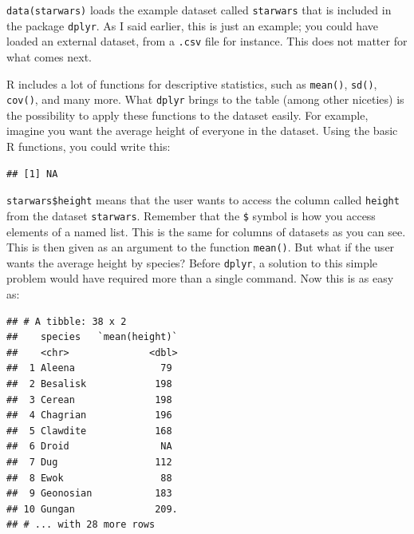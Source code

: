 \documentclass[]{gitbook}
\newenvironment{Shaded}{\begin{snugshade}}{\end{snugshade}}
\newcommand{\KeywordTok}[1]{\textcolor[rgb]{0.13,0.29,0.53}{\textbf{#1}}}
\newcommand{\NormalTok}[1]{#1}
\newcommand{\OperatorTok}[1]{\textcolor[rgb]{0.81,0.36,0.00}{\textbf{#1}}}
\newcommand{\StringTok}[1]{\textcolor[rgb]{0.31,0.60,0.02}{#1}}
\theoremstyle{definition}
\theoremstyle{definition}
\theoremstyle{definition}
\theoremstyle{remark}
\begin{document}
\texttt{data(starwars)} loads the example dataset called
\texttt{starwars} that is included in the package \texttt{dplyr}. As I
said earlier, this is just an example; you could have loaded an external
dataset, from a \texttt{.csv} file for instance. This does not matter
for what comes next.

R includes a lot of functions for descriptive statistics, such as
\texttt{mean()}, \texttt{sd()}, \texttt{cov()}, and many more. What
\texttt{dplyr} brings to the table (among other niceties) is the
possibility to apply these functions to the dataset easily. For example,
imagine you want the average height of everyone in the dataset. Using
the basic R functions, you could write this:

\begin{Shaded}
\end{Shaded}

\begin{verbatim}
## [1] NA
\end{verbatim}

\texttt{starwars\$height} means that the user wants to access the column
called \texttt{height} from the dataset \texttt{starwars}. Remember that
the \texttt{\$} symbol is how you access elements of a named list. This
is the same for columns of datasets as you can see. This is then given
as an argument to the function \texttt{mean()}. But what if the user
wants the average height by species? Before \texttt{dplyr}, a solution
to this simple problem would have required more than a single command.
Now this is as easy as:

\begin{Shaded}
\end{Shaded}

\begin{verbatim}
## # A tibble: 38 x 2
##    species   `mean(height)`
##    <chr>              <dbl>
##  1 Aleena               79 
##  2 Besalisk            198 
##  3 Cerean              198 
##  4 Chagrian            196 
##  5 Clawdite            168 
##  6 Droid                NA 
##  7 Dug                 112 
##  8 Ewok                 88 
##  9 Geonosian           183 
## 10 Gungan              209.
## # ... with 28 more rows
\end{verbatim}
\end{document}
